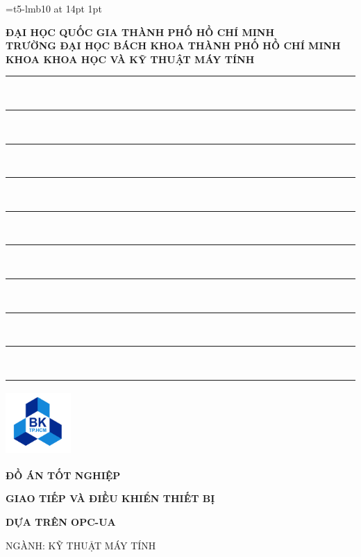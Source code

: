 \font\td=t5-lmb10 at 14pt
\setlength{\fboxsep} {1pt}
\begin{titlepage}


\begin{center}
    \textbf{ĐẠI HỌC QUỐC GIA THÀNH PHỐ HỒ CHÍ MINH}\\
    \textbf{TRƯỜNG ĐẠI HỌC BÁCH KHOA THÀNH PHỐ HỒ CHÍ MINH}\\
    \textbf{KHOA KHOA HỌC VÀ KỸ THUẬT MÁY TÍNH}\\
    \rule{0.1in}{1pt}\ \rule{0.1in}{1pt}\ \rule{0.1in}{1pt}\ \rule{0.1in}{1pt}\ \rule{0.1in}{1pt}\ \rule{0.1in}{1pt}\ \rule{0.1in}{1pt}\ \rule{0.1in}{1pt}\ \rule{0.1in}{1pt}\ \rule{0.1in}{1pt}
\end{center}

\vspace{0cm}
\begin{center}
\includegraphics[width=2.5cm,height=2.5cm]{Images/Logo BK.png}\\
\end{center}

\vspace{0cm}
\begin{center}
 {\bf {\td \Large ĐỒ ÁN TỐT NGHIỆP}}
\end{center}
\vspace{.4cm}

\begin{center}
    \centerline{\bf \td \Large GIAO TIẾP VÀ ĐIỀU KHIỂN THIẾT BỊ}
    \vspace{.1cm}
    \centerline{\bf \td \Large DỰA TRÊN OPC-UA}
    \vspace{.1cm}
    \vspace{.5cm}
    \centerline{NGÀNH: KỸ THUẬT MÁY TÍNH}
\end{center}


\end{titlepage}
